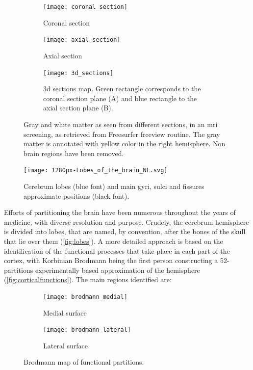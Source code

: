 \begin{figure}[H]
	\centering
	\begin{subfigure}{0.475\linewidth}
		
		\centering
		\texttt{[image: coronal\_section]}
		\caption{Coronal section}
		\label{fig:coronal}
		
	\end{subfigure}
	\hfill
	\begin{subfigure}{0.475\linewidth}
		
		\centering
		\texttt{[image: axial\_section]}
		\caption{Axial section}
		\label{fig:axial}
	\end{subfigure}
	\vfill
	\begin{subfigure}{0.475\linewidth}
		
		\centering
		\texttt{[image: 3d\_sections]}
		\caption{\Ac{3d} sections map. Green rectangle corresponds to the coronal section plane (A) and
			blue rectangle to the axial section plane (B).}
	\end{subfigure}
	\caption[\Ac{mri} screening of gray and white matter]{Gray and white matter as seen from different sections, in an \ac{mri} screening, as retrieved from Freesurfer freeview routine. The gray matter is annotated with yellow color in the right hemisphere. Non brain regions have been removed.}
	\label{fig:cerebissection}
\end{figure}



\begin{figure}[H]
	\centering
	\texttt{[image: 1280px-Lobes\_of\_the\_brain\_NL.svg]}
	\caption[A crude cerebrum partitioning]{Cerebrum lobes (blue font) and main gyri, sulci and fissures approximate positions (black font).}
	\label{fig:lobes}
\end{figure}

Efforts of partitioning the brain have been numerous throughout the years of medicine, with diverse resolution and purpose. Crudely, the cerebrum hemisphere is divided into lobes, that are named, by convention, after the bones of the skull that lie over them (\autoref{fig:lobes}).  A more detailed approach is based on the identification of the functional processes that take place in each part of the cortex, with Korbinian Brodmann being the first person constructing a 52-partitions experimentally based approximation of the hemisphere \cite{Brodmann1909} (\autoref{fig:corticalfunctions}). The main regions identified are:

\begin{figure}[H]
	\centering
	\begin{subfigure}{0.45\textwidth}
		\centering
		\texttt{[image: brodmann\_medial]}
		\caption{Medial surface}
		\label{fig:brodmann_medial}
	\end{subfigure}
	\hfill
	\begin{subfigure}{0.45\textwidth}
	\centering
	\texttt{[image: brodmann\_lateral]}
	\caption{Lateral surface}
	\label{fig:brodmann_lateral}
	
	\end{subfigure}
	\caption{Brodmann map of functional partitions.}
	\label{fig:corticalfunctions}
\end{figure}


